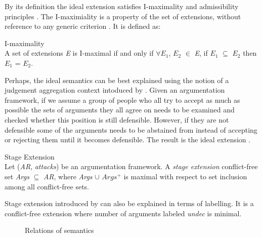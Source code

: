 By its definition the ideal extension satisfies I-maximality and admissibility principles \citep{baroni2009semantics}. The I-maximiality is a property of the set of extensions, without reference to any generic criterion \citep{dunne2006computational}. It is defined as:

\begin{definition}{I-maximality}
\label{def:IMaximality}\\
A set of extensions \textit{E} is I-maximal if and only if $\forall$\textit{$E_1$}, \textit{$E_2$} $\in$ \textit{E}, if \textit{$E_1$} $\subseteq$ \textit{$E_2$} then \textit{$E_1$} = \textit{$E_2$}.
\end{definition}

Perhaps, the ideal semantics can be best explained using the notion of a judgement aggregation context intoduced by \citet{caminada2011judgment}. Given an argumentation framework, if we assume a group of people who all try to accept as much as possible the sets of arguments they all agree on needs to be examined and checked whether this position is still defensible. However, if they are not defensible some of the arguments needs to be abstained from instead of accepting or rejecting them until it becomes defensible. The result is the ideal extension \citep{baroni2011introduction}.

\begin{definition}{Stage Extension}
\label{def:stageExtension}\\
Let (\textit{AR}, \textit{attacks}) be an argumentation framework. A \textit{stage extension} conflict-free set \textit{Args} $\subseteq$ \textit{AR}, where \textit{Args} $\cup$ \textit{$Args^+$} is maximal with respect to set inclusion among all conflict-free sets.
\end{definition}

Stage extension introduced by \citet{verheij1996two} can also be explained in terms of labelling. It is a conflict-free extension where number of arguments labeled \textit{undec} is minimal. 
\newline

\begin{figure}[h]
\centering
{}
\caption{Relations of semantics}
\label{fig:semanticsRelations}
\end{figure}

